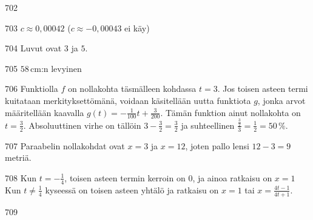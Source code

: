 \begin{Vastaus}{702}
    
\end{Vastaus}
\begin{Vastaus}{703}
	$c\approx 0,00042$ ($c \approx -0,00043$ ei käy)
	
\end{Vastaus}
\begin{Vastaus}{704}
		Luvut ovat $3$ ja $5$.
    
\end{Vastaus}
\begin{Vastaus}{705}
		$58$\,cm:n levyinen
    
\end{Vastaus}
\begin{Vastaus}{706}
Funktiolla $f$ on nollakohta täsmälleen kohdassa $t=3$. Jos toisen asteen termi kuitataan merkityksettömänä, voidaan käsitellään uutta funktiota $g$, jonka arvot määritellään kaavalla $g(t)=-\frac{1}{100}t+\frac{3}{200}$. Tämän funktion ainut nollakohta on $t=\frac{3}{2}$. Absoluuttinen virhe on tällöin $3-\frac{3}{2}=\frac{3}{2}$ ja suhteellinen $\frac{\frac{3}{2}}{3}=\frac{1}{2}=50\,\%$.
    
\end{Vastaus}
\begin{Vastaus}{707}
		Paraabelin nollakohdat ovat $x=3$ ja $x=12$, joten pallo lensi $12-3 = 9$ metriä.
	
\end{Vastaus}
\begin{Vastaus}{708}
		Kun $t=-\frac{1}{4}$, toisen asteen termin kerroin on $0$, ja ainoa ratkaisu on $x = 1$  \\
		Kun $t \neq \frac{1}{4}$ kyseessä on toisen asteen yhtälö ja ratkaisu on $x= 1$ tai $x=\frac{4t-1}{4t+1}$.
    
\end{Vastaus}
\begin{Vastaus}{709}
	
\end{Vastaus}
